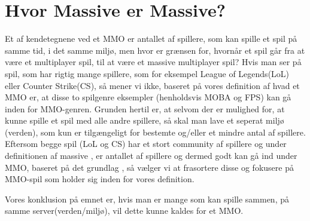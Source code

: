 \cfoot{\page\textbackslash \totalp} %
\chapter{Hvor Massive er Massive?}

Et af kendetegnene ved et MMO er antallet af spillere, som kan spille et spil på samme tid, i det samme miljø, men hvor er grænsen for, hvornår et spil går fra at være et multiplayer spil, til at være et massive multiplayer spil? Hvis man ser på spil, som har rigtig mange spillere, som for eksempel League of Legends(LoL)\cite{LoL} eller Counter Strike(CS)\cite{CS}, så mener vi ikke, baseret på vores definition af hvad et MMO er, at disse to spilgenre eksempler (henholdsvis MOBA og FPS) kan gå inden for MMO-genren. Grunden hertil er, at selvom der er mulighed for, at kunne spille et spil med alle andre spillere, så skal man lave et seperat miljø (verden), som kun er tilgængeligt for bestemte og/eller et mindre antal af spillere.
Eftersom begge spil (LoL og CS) har et stort community af spillere og under definitionen af massive \cite{HTL}, er antallet af spillere og dermed godt kan gå ind under MMO, baseret på det grundlag , så vælger vi at frasortere disse og fokusere på MMO-spil som holder sig inden for vores definition.

Vores konklusion på emnet er, hvis man er mange som kan spille sammen, på samme server(verden/miljø), vil dette kunne kaldes for et MMO.